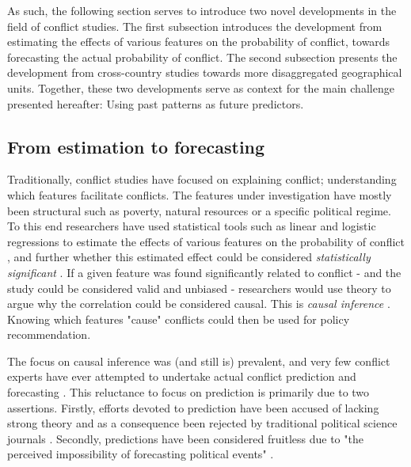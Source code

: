 \documentclass[a4paper]{article}
\begin{document}
As such, the following section serves to introduce two novel developments in the field of conflict studies. The first subsection introduces the development from estimating the effects of various features on the probability of conflict, towards forecasting the actual probability of conflict. The second subsection presents the development from cross-country studies towards more disaggregated geographical units. Together, these two developments serve as context for the main challenge presented hereafter: Using past patterns as future predictors.\par


\subsection{From estimation to forecasting}\label{est_to_pred} %


Traditionally, conflict studies have focused on explaining conflict; understanding which features facilitate conflicts. The features under investigation have mostly been structural such as poverty, natural resources or a specific political regime. To this end researchers have used statistical tools such as linear and logistic regressions to estimate the effects of various features on the probability of conflict \citep[8]{chadefaux2017conflict}, and further whether this estimated effect could be considered \emph{statistically significant} \citep[363-364]{Ward_Greenhill_Bakke_2010}. If a given feature was found significantly related to conflict - and the study could be considered valid and unbiased - researchers would use theory to argue why the correlation could be considered causal. This is \emph{causal inference} \citep[8]{chadefaux2017conflict}. Knowing which features "cause" conflicts could then be used for policy recommendation.\par

The focus on causal inference was (and still is) prevalent, and very few conflict experts have ever attempted to undertake actual conflict prediction and forecasting \citep[474]{cederman2017predicting}. This reluctance to focus on prediction is primarily due to two assertions. Firstly, efforts devoted to prediction have been accused of lacking strong theory and as a consequence been rejected by traditional political science journals \citep[8-9]{chadefaux2017conflict}. Secondly, predictions have been considered fruitless due to "the perceived impossibility of forecasting political events" \citep[8]{chadefaux2017conflict}.
\end{document}
